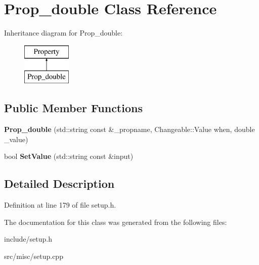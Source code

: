 \hypertarget{classProp__double}{\section{Prop\-\_\-double Class Reference}
\label{classProp__double}
}
Inheritance diagram for Prop\-\_\-double\-:\begin{figure}[H]
\begin{center}
\leavevmode
\includegraphics[height=2.000000cm]{classProp__double}
\end{center}
\end{figure}
\subsection*{Public Member Functions}
\begin{DoxyCompactItemize}
\item 
\hypertarget{classProp__double_aa0facf6624ff88ee5d29fd70c5245ae9}{{\bfseries Prop\-\_\-double} (std\-::string const \&\-\_\-propname, Changeable\-::\-Value when, double \-\_\-value)}\label{classProp__double_aa0facf6624ff88ee5d29fd70c5245ae9}

\item 
\hypertarget{classProp__double_a29d1175964f35a4aa6b5e482e3dfdf00}{bool {\bfseries Set\-Value} (std\-::string const \&input)}\label{classProp__double_a29d1175964f35a4aa6b5e482e3dfdf00}

\end{DoxyCompactItemize}


\subsection{Detailed Description}


Definition at line 179 of file setup.\-h.



The documentation for this class was generated from the following files\-:\begin{DoxyCompactItemize}
\item 
include/setup.\-h\item 
src/misc/setup.\-cpp\end{DoxyCompactItemize}
